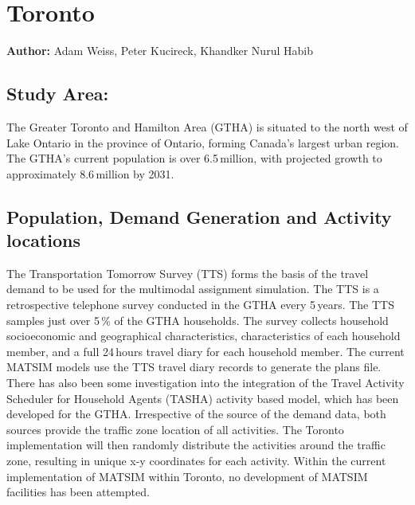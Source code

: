 \section{Toronto}
\label{sec:toronto}
\hfill \textbf{Author:} Adam Weiss, Peter Kucireck, Khandker Nurul Habib

\subsection{Study Area:}
The Greater Toronto and Hamilton Area (GTHA) is situated to the north west of Lake Ontario in the province of Ontario, forming Canada’s largest urban region. The GTHA’s current population is over 6.5\,million, with projected growth to approximately 8.6\,million by 2031. 

\subsection{Population, Demand Generation and Activity locations}
The Transportation Tomorrow Survey (TTS) forms the basis of the travel demand to be used for the multimodal assignment simulation. The TTS is a retrospective telephone survey conducted in the GTHA every 5\,years. The TTS samples just over 5\,\% of the GTHA households. The survey collects household socioeconomic and geographical characteristics, characteristics of each household member, and a full 24\,hours travel diary for each household member. The current MATSIM models use the TTS travel diary records to generate the plans file. There has also been some investigation into the integration of the Travel Activity Scheduler for Household Agents (TASHA) activity based model, which has been developed for the GTHA. Irrespective of the source of the demand data, both sources provide the traffic zone location of all activities. The Toronto implementation will then randomly distribute the activities around the traffic zone, resulting in unique x-y coordinates for each activity. Within the current implementation of MATSIM within Toronto, no development of MATSIM facilities has been attempted.

